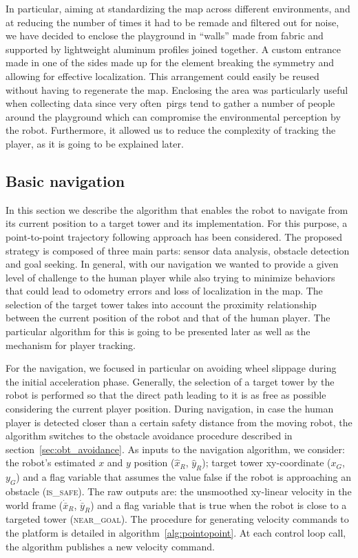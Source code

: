 In particular, aiming at standardizing the map across different environments, and at reducing the number of times it had to be remade and filtered out for noise, we have decided to enclose the playground in ``walls'' made from fabric and supported by lightweight aluminum profiles joined together. A custom entrance made in one of the sides made up for the element breaking the symmetry and allowing for effective localization. This arrangement could easily be reused without having to regenerate the map. Enclosing the area was particularly useful when collecting data since very often~\gls{pirg}s tend to gather a number of people around the playground which can compromise the environmental perception by the robot. Furthermore, it allowed us to reduce the complexity of tracking the player, as it is going to be explained later. %

\subsection{Basic navigation}
In this section we describe the algorithm that enables the robot to navigate from its current position to a target tower and its implementation. For this purpose, a point-to-point trajectory following approach has been considered. The proposed strategy is composed of three main parts: sensor data analysis, obstacle detection and goal seeking. In general, with our navigation we wanted to provide a given level of challenge to the human player while also trying to minimize behaviors that could lead to odometry errors and loss of localization in the map. The selection of the target tower takes into account the proximity relationship between the current position of the robot and that of the human player. The particular algorithm for this is going to be presented later as well as the mechanism for player tracking.%

For the navigation, we focused in particular on avoiding wheel slippage during the initial acceleration phase. %
Generally, the selection of a target tower by the robot is performed so that the direct path leading to it is as free as possible considering the current player position. 
During navigation, in case the human player is detected closer than a certain safety distance from the moving robot, the algorithm switches to the obstacle avoidance procedure described in section~\ref{sec:obt_avoidance}. As inputs to the navigation algorithm, we consider: the robot's estimated $x$ and $y$ position ($\hat{x}_R$, $\hat{y}_R$); target tower xy-coordinate ($x_G$, $y_G$) and a flag variable that assumes the value false if the robot is approaching an obstacle (\textsc{is\_safe}). The raw outputs are: the unsmoothed xy-linear velocity in the world frame ($\dot{\bar{x}}_R$, $\dot{\bar{y}}_R$) and a flag variable that is true when the robot is close to a targeted tower (\textsc{near\_goal}). The procedure for generating velocity commands to the platform is detailed in algorithm~\ref{alg:pointopoint}. At each control loop call, the algorithm publishes a new velocity command.

